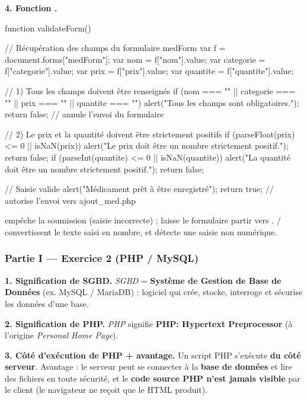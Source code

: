 \medskip
\textbf{4. Fonction .}

\begin{codejs}
function validateForm() {
  // Récupération des champs du formulaire medForm
  var f = document.forms["medForm"];
  var nom       = f["nom"].value;
  var categorie = f["categorie"].value;
  var prix      = f["prix"].value;
  var quantite  = f["quantite"].value;

  // 1) Tous les champs doivent être renseignés
  if (nom === "" || categorie === "" || prix === "" || quantite === "") {
    alert("Tous les champs sont obligatoires.");
    return false;   // annule l'envoi du formulaire
  }

  // 2) Le prix et la quantité doivent être strictement positifs
  if (parseFloat(prix) <= 0 || isNaN(prix)) {
    alert("Le prix doit être un nombre strictement positif.");
    return false;
  }
  if (parseInt(quantite) <= 0 || isNaN(quantite)) {
    alert("La quantité doit être un nombre strictement positif.");
    return false;
  }

  // Saisie valide
  alert("Médicament prêt à être enregistré");
  return true;      // autorise l'envoi vers ajout_med.php
}
\end{codejs}

\begin{remarque}
 empêche la soumission (saisie incorrecte) ;  laisse
le formulaire partir vers . /
convertissent le texte saisi en nombre, et  détecte une saisie non numérique.
\end{remarque}

\subsubsection*{Partie I — Exercice 2 (PHP / MySQL)}

\textbf{1. Signification de SGBD.} \emph{SGBD} = \textbf{Système de Gestion de Base de
Données} (ex. MySQL / MariaDB) : logiciel qui crée, stocke, interroge et sécurise les
données d'une base.

\medskip
\textbf{2. Signification de PHP.} \emph{PHP} signifie \textbf{PHP: Hypertext Preprocessor}
(à l'origine \emph{Personal Home Page}).

\medskip
\textbf{3. Côté d'exécution de PHP + avantage.} Un script PHP s'exécute \textbf{du côté
serveur}. Avantage : le serveur peut se connecter à la \textbf{base de données} et lire
des fichiers en toute sécurité, et le \textbf{code source PHP n'est jamais visible} par le
client (le navigateur ne reçoit que le HTML produit).


